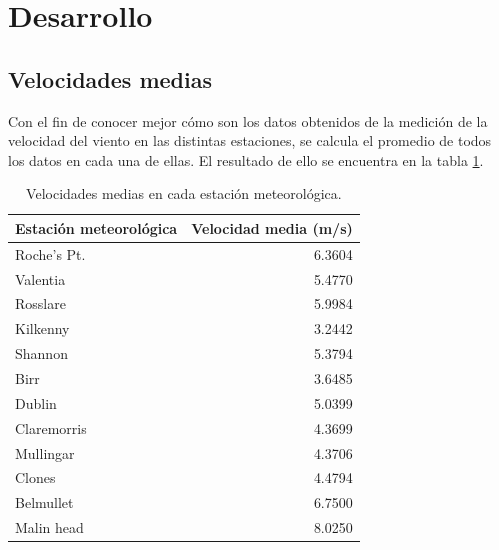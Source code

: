 \documentclass[journal, monochrome]{IEEEtran}
\begin{document}
\section{Desarrollo}
\label{section:development}

\subsection{Velocidades medias}
\par
Con el fin de conocer mejor cómo son los datos obtenidos de la medición de la velocidad del viento en las distintas estaciones, se calcula el promedio de todos los datos en cada una de ellas. El resultado de ello se encuentra en la tabla \ref{table:speed}.

\begin{table}
	\begin{center}
		\begin{tabular}{l|r}
			Estación meteorológica & Velocidad media (m/s) \\
			\hline
			Roche's Pt. & 6.3604 \\ 
			Valentia & 5.4770 \\
			Rosslare & 5.9984 \\
			Kilkenny & 3.2442 \\
			Shannon & 5.3794 \\
			Birr & 3.6485 \\
			Dublin & 5.0399 \\
			Claremorris & 4.3699 \\
			Mullingar & 4.3706 \\
			Clones & 4.4794 \\
			Belmullet & 6.7500 \\
			Malin head & 8.0250 \\
		\end{tabular}
		\caption{Velocidades medias en cada estación meteorológica.}
		\label{table:speed}
	\end{center}
\end{table}

\vspace{0.5cm}
\end{document}

